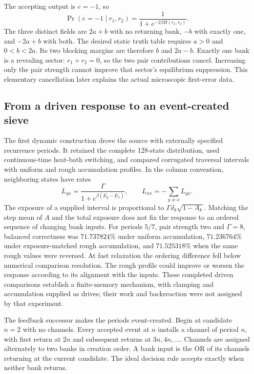 The accepting output is $e=-1$, so
\[
 \Pr(e=-1\mid r_1,r_2)
       =\frac{1}{1+e^{-2\beta H(r_1,r_2)}}.
\]
The three distinct fields are $2a+b$ with no returning bank, $-b$ with exactly one, and $-2a+b$ with both. The desired static truth table requires $a>0$ and $0<b<2a$. Its two blocking margins are therefore $b$ and $2a-b$. Exactly one bank is a revealing sector: $r_1+r_2=0$, so the two pair contributions cancel. Increasing only the pair strength cannot improve that sector's equilibrium suppression. This elementary cancellation later explains the actual microscopic first-error data.

\subsection{From a driven response to an event-created sieve}

The first dynamic construction drove the source with externally specified recurrence periods. It retained the complete 128-state distribution, used continuous-time heat-bath switching, and compared corrugated traversal intervals with uniform and rough accumulation profiles. In the column convention, neighboring states have rates
\[
 L_{yx}=\frac{\Gamma}{1+e^{\beta(E_y-E_x)}},
 \qquad L_{xx}=-\sum_{y\ne x}L_{yx}.
\]
The exposure of a supplied interval is proportional to $\Gamma d_k\sqrt{1-A_k}$. Matching the step mean of $A$ and the total exposure does not fix the response to an ordered sequence of changing bank inputs. For periods $5/7$, pair strength two and $\Gamma=8$, balanced correctness was $71.737824\%$ under uniform accumulation, $71.236764\%$ under exposure-matched rough accumulation, and $71.525318\%$ when the same rough values were reversed. At fast relaxation the ordering difference fell below numerical comparison resolution. The rough profile could improve or worsen the response according to its alignment with the inputs. These completed driven comparisons establish a finite-memory mechanism, with clamping and accumulation supplied as drives; their work and backreaction were not assigned by that experiment.

The feedback successor makes the periods event-created. Begin at candidate $n=2$ with no channels. Every accepted event at $n$ installs a channel of period $n$, with first return at $2n$ and subsequent returns at $3n,4n,\ldots$. Channels are assigned alternately to two banks in creation order. A bank input is the OR of its channels returning at the current candidate. The ideal decision rule accepts exactly when neither bank returns.

